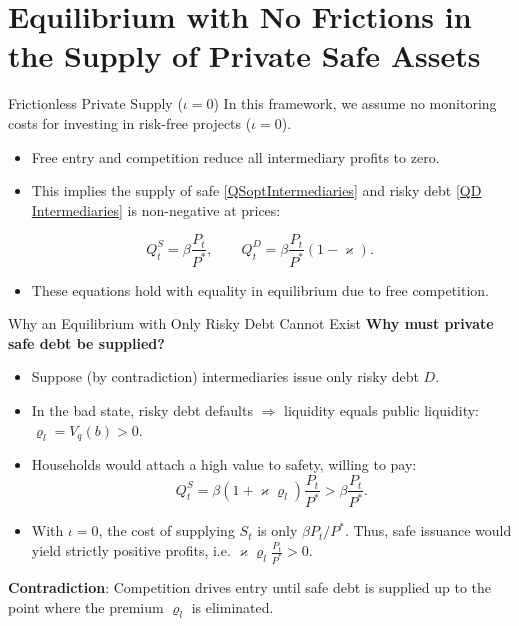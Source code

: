 \documentclass[11pt,aspectratio=169]{beamer}
\begin{document}
\section{Equilibrium with No Frictions in the Supply of Private Safe Assets}

\begin{frame}{Frictionless Private Supply ($\iota = 0$)}
\small
In this framework, we assume no monitoring costs for investing in risk-free projects ($\iota = 0$). 

\vspace{0.2cm}
\begin{itemize}
    \item Free entry and competition reduce all intermediary profits to zero.
    \item This implies the supply of safe \eqref{QSoptIntermediaries} and risky debt \eqref{QD Intermediaries} is non-negative at prices:
\end{itemize}
\begin{equation}
Q_{t}^{S}=\beta \frac{P_{t}}{P^{\ast }}, \qquad Q_{t}^{D}=\beta \frac{P_{t}}{P^{\ast }}(1-\varkappa ). \label{QsQD}
\end{equation}
\begin{itemize}
    \item These equations hold with equality in equilibrium due to free competition.
\end{itemize}
\end{frame}

\begin{frame}{Why an Equilibrium with Only Risky Debt Cannot Exist}
\small
\textbf{Why must private safe debt be supplied?} 
\begin{itemize}
    \item Suppose (by contradiction) intermediaries issue only risky debt $D$.
  \item In the bad state, risky debt defaults $\Rightarrow$ liquidity equals public liquidity: $\varrho_l=V_q(b)>0$.
  \item Households would attach a high value to safety, willing to pay:
  \[
    Q_t^S=\beta\left(1+\varkappa\varrho_l\right)\frac{P_t}{P^\ast} > \beta\frac{P_t}{P^\ast}.
  \]
  \item With $\iota=0$, the cost of supplying $S_t$ is only $\beta P_t/P^*$. Thus, safe issuance would yield strictly positive profits, i.e. $\varkappa\varrho_l\frac{P_t}{P^\ast}>0$.
\end{itemize}
\vspace{0.2cm}
\textbf{Contradiction}: Competition drives entry until safe debt is supplied up to the point where the premium $\varrho_l$ is eliminated.
\end{frame}
\end{document}
